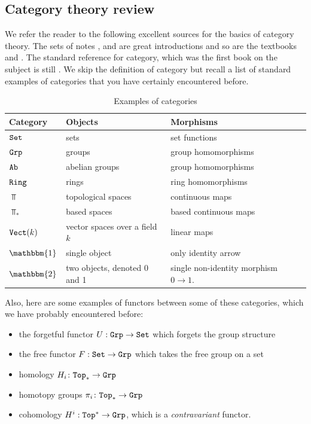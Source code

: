 \documentclass{article}[11pt]
\begin{document}
\subsection{Category theory review}

We refer the reader to the following excellent sources for the basics of category theory. The sets of notes \cite{WOMP},\cite{Torres-cat} and \cite{mehrle} are great introductions and so are the textbooks \cite{leinster} and \cite{Riehl-context}. The standard reference for category, which was the first book on the subject is still \cite{maclane}. We skip the definition of category but recall a list of standard examples of categories that you have certainly encountered  before. 

\begin{table}[h]
    \centering
    \caption{Examples of categories}
    \begin{tabular}{ p{2cm} l  p{5cm}  p{8cm} }
        \toprule
\textbf{Category}      
& \textbf{Objects}   
& \textbf{Morphisms} \\\midrule
$\texttt{Set}$ & sets & set functions \\\hline

$\texttt{Grp}$ & groups &group homomorphisms \\\hline
	 $\texttt{Ab}$ & abelian groups &group homomorphisms \\\hline
         $\texttt{Ring}$ & rings& ring homomorphisms \\\hline
	 $\Top$& topological spaces & continuous maps\\\hline
	 $\Top_\ast$ & based spaces & based continuous maps\\\hline
	 $\texttt{Vect}(k)$& vector spaces over a field $k$ & linear maps\\\hline
	 $\mathbbm{1}$ & single object & only identity arrow\\\hline
	 $\mathbbm{2}$ & two objects, denoted 0 and 1 & single non-identity morphism $0\to 1$.\\
	 \bottomrule
    \end{tabular}
\end{table}


Also, here are some examples of functors between some of these categories, which we have probably encountered before:
\begin{itemize}\itemsep0em 
	\item the {forgetful functor}  $U: \texttt{Grp} \to \texttt{Set}$ which forgets the group structure
	\item  the {free functor} $F:\texttt{Set} \to \texttt{Grp}$  which takes the free group on a set
	\item  homology $H_i \colon \texttt{Top}_\ast \to \texttt{Grp}$ 
	\item  homotopy groups $\pi_i \colon \texttt{Top}_\ast \to \texttt{Grp}$ 
	\item cohomology $H^i : \texttt{Top}^\ast \to \texttt{Grp}$, which is a \textit{contravariant} functor.
\end{itemize}
\end{document}
